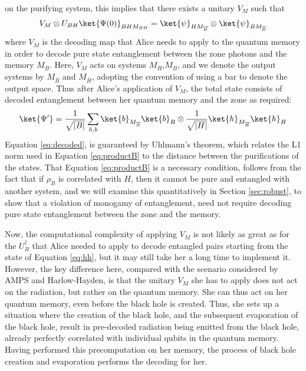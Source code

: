\documentclass[12pt,a4paper]{article}
\begin{document}
on the purifying system, this implies that there exists a unitary $V_{M}$ such that
\begin{align}
V_{M}\otimes U_{BH}\ket{\Psi(0)}_{BHM_{BH}}=\ket{\psi}_{HM_{\overline{H}}}\otimes\ket{\psi}_{BM_{\overline{B}}}
\end{align}
where $V_{M}$ is the decoding map that Alice needs to apply to the quantum memory in order to decode pure state
entanglement between the zone photons and the memory $M_B$.  Here, $V_{M}$ acts on systems $M_H$,$M_B$, and we denote the output systems
by $M_{\overline{B}}$ and $M_{\overline{H}}$, adopting the convention of using a bar to denote the output space. Thus after Alice's application of $V_{M}$, the total state 
consists of decoded entanglement between her quantum memory and the zone as required: 
\begin{align}
\ket{\Psi'}=\frac{1}{\sqrt{|B|}}
\sum_{h,b}\ket{b}_{M_{\overline B}}\ket{b}_B\otimes \frac{1}{\sqrt{|H|}}\ket{h}_{M_{\overline H}} \ket{h}_{H}
\label{eq:decoded}
\end{align}
Equation \eqref{eq:decoded}, is guaranteed by Uhlmann's theorem\cite{uhlmann1976transition}, which relates the L1 norm used in Equation \eqref{eq:productB} to the distance between the purifications of the states. That Equation \eqref{eq:productB} is a necessary condition, follows from the fact that if $\rho_B$ is correlated with $H$, then it cannot be pure and entangled with another system, and we will examine this quantitatively in Section \ref{sec:robust},
to show that a violation of monogamy of entanglement, need not require decoding pure state entanglement between the zone and the memory.

Now, the computational complexity of applying $V_{M}$ is not likely as great as for the $U^\dagger_R$ that Alice needed to apply to decode entangled pairs starting from
the state of Equation \eqref{eq:hh}, but it may still take her a long time to implement it. However, the key difference here, compared with the scenario considered by AMPS and Harlow-Hayden, is that the unitary $V_{M}$ she has to apply does not act on the radiation, but rather on the quantum memory. She can thus act 
on her quantum memory, even before the black hole is created. Thus, she sets up a situation where the creation of the black hole, and the subsequent evaporation of the black hole, result in pre-decoded radiation being emitted from the black hole, already perfectly correlated with individual qubits in the quantum memory. Having performed this precomputation on her memory, the process of black hole creation and evaporation performs the decoding for her.
\end{document}

